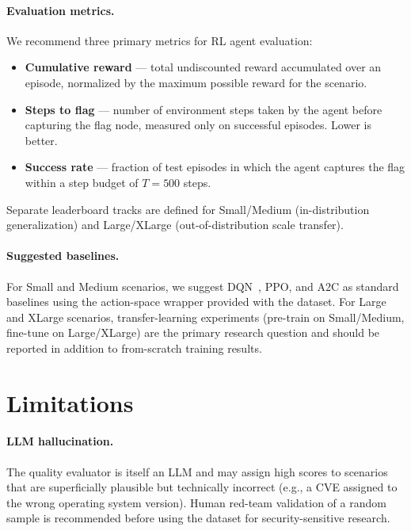 \documentclass[11pt,a4paper]{article}
\begin{document}
\paragraph{Evaluation metrics.}
We recommend three primary metrics for RL agent evaluation:
\begin{itemize}
    \item \textbf{Cumulative reward} — total undiscounted reward accumulated
          over an episode, normalized by the maximum possible reward for the
          scenario.
    \item \textbf{Steps to flag} — number of environment steps taken by the
          agent before capturing the flag node, measured only on successful
          episodes.  Lower is better.
    \item \textbf{Success rate} — fraction of test episodes in which the agent
          captures the flag within a step budget of $T = 500$ steps.
\end{itemize}

Separate leaderboard tracks are defined for Small/Medium (in-distribution
generalization) and Large/XLarge (out-of-distribution scale transfer).

\paragraph{Suggested baselines.}
For Small and Medium scenarios, we suggest DQN~\cite{cyberbattlesim2021},
PPO, and A2C as standard baselines using the action-space wrapper provided
with the dataset.  For Large and XLarge scenarios, transfer-learning
experiments (pre-train on Small/Medium, fine-tune on Large/XLarge) are the
primary research question and should be reported in addition to
from-scratch training results.

\section{Limitations}
\label{sec:limitations}

\paragraph{LLM hallucination.}
The quality evaluator is itself an LLM and may assign high scores to
scenarios that are superficially plausible but technically incorrect (e.g.,
a CVE assigned to the wrong operating system version).  Human red-team
validation of a random sample is recommended before using the dataset for
security-sensitive research.
\end{document}
